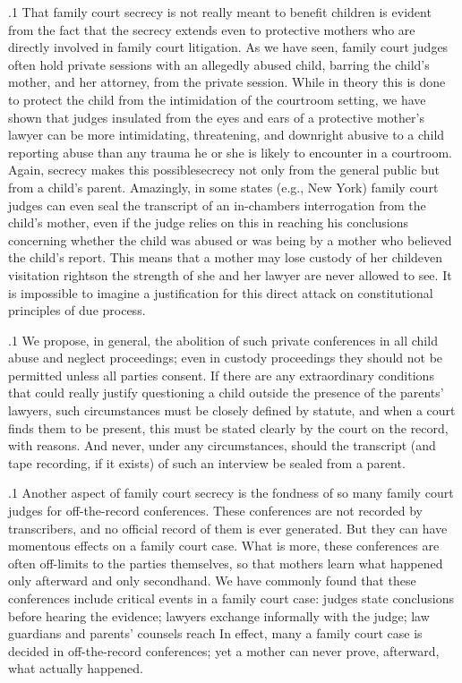 \documentclass[11pt, twoside]{article}
\begin{document}
{\p.1{%
That family court secrecy is not really meant to benefit children is evident from the fact that the secrecy extends even to protective mothers
who are directly involved in family court litigation. As we have seen,
family court judges often hold private sessions with an allegedly abused
child, barring the child’s mother, and her attorney, from the private
session. While in theory this is done to protect the child from the intimidation of the courtroom setting, we have shown that judges insulated
from the eyes and ears of a protective mother’s lawyer can be more intimidating, threatening, and downright abusive to a child reporting abuse
than any trauma he or she is likely to encounter in a courtroom. Again,
secrecy makes this possible\mdash{}secrecy not only from the general public
but from a child’s parent. Amazingly, in some states (e.g., New York)
family court judges can even seal the transcript of an in-chambers interrogation from the child’s mother, even if the judge relies on this in
reaching his conclusions concerning whether the child was abused or
was being  by a mother who believed the child’s report. This
means that a mother may lose custody of her child\mdash{}even visitation
rights\mdash{}on the strength of  she and her lawyer are never allowed to see. It is impossible to imagine a justification for this direct
attack on constitutional principles of due process.
}%

\p.1{%
We propose, in general, the abolition of such private conferences in
all child abuse and neglect proceedings; even in custody proceedings
they should not be permitted unless all parties consent. If there are any
extraordinary conditions that could really justify questioning a child
outside the presence of the parents’ lawyers, such circumstances must
be closely defined by statute, and when a court finds them to be present,
this must be stated clearly by the court on the record, with reasons.
And never, under any circumstances, should the transcript (and tape
recording, if it exists) of such an interview be sealed from a parent.
}%

\p.1{%
Another aspect of family court secrecy is the fondness of so many
family court judges for off-the-record conferences. These conferences
are not recorded by transcribers, and no official record of them is ever
generated. But they can have momentous effects on a family court case.
What is more, these conferences are often off-limits to the parties themselves, so that mothers learn what happened only afterward and only
secondhand. We have commonly found that these conferences include
critical events in a family court case: judges state conclusions before
hearing the evidence; lawyers exchange  informally with the
judge; law guardians and parents’ counsels reach  In
effect, many a family court case is decided in off-the-record conferences;
yet a mother can never prove, afterward, what actually happened.
}%

}
\end{document}
